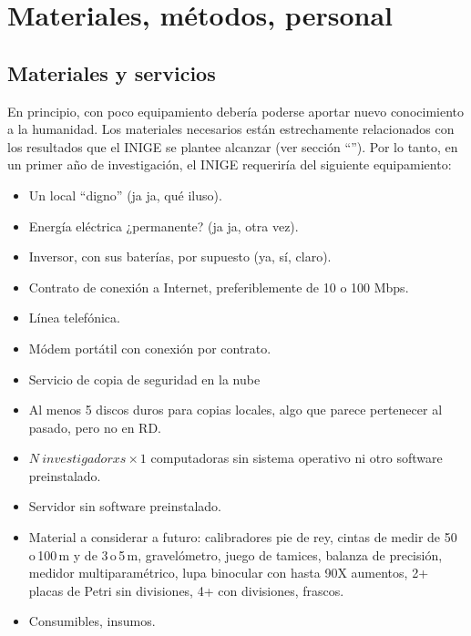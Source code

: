 \documentclass[12pt,letterpaper,spanish]{article}
\newcommand{\entacron}{INIGE}
\begin{document}
\section{Materiales, métodos, personal} \label{cap:matmetpers}

\subsection{Materiales y servicios} \label{cap:matser}

En principio, con poco equipamiento debería poderse aportar nuevo conocimiento a la humanidad. Los materiales necesarios están estrechamente relacionados con los resultados que el \entacron{} se plantee alcanzar (ver sección ``''). Por lo tanto, en un primer año de investigación, el \entacron{} requeriría del siguiente equipamiento:

\begin{itemize}
\item Un local ``digno'' (ja ja, qué iluso).
\item Energía eléctrica ¿permanente? (ja ja, otra vez).
\item Inversor, con sus baterías, por supuesto (ya, sí, claro).
\item Contrato de conexión a Internet, preferiblemente de 10 o 100 Mbps.
\item Línea telefónica.
\item Módem portátil con conexión por contrato.
\item Servicio de copia de seguridad en la nube
\item Al menos 5 discos duros para copias locales, algo que parece pertenecer al pasado, pero no en RD.
\item $N~investigadorxs \times 1$ computadoras sin sistema operativo ni otro software preinstalado.
\item Servidor sin software preinstalado.
\item Material a considerar a futuro: calibradores pie de rey, cintas de medir de 50\,o\,100\,m y de 3\,o\,5\,m, gravelómetro, juego de tamices, balanza de precisión, medidor multiparamétrico, lupa binocular con hasta 90X aumentos, 2+ placas de Petri sin divisiones, 4+ con divisiones, frascos.
\item Consumibles, insumos.
\end{itemize}
\end{document}
